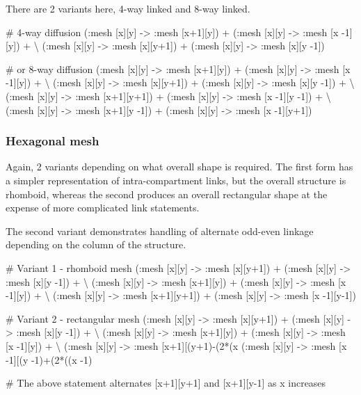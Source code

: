 There are 2 variants here, 4-way linked and 8-way linked.

\begin{kappasource}

# 4-way diffusion
    (:mesh [x][y] -> :mesh [x+1][y]) + (:mesh [x][y] -> :mesh [x -1][y]) + {\textbackslash}
    (:mesh [x][y] -> :mesh [x][y+1]) + (:mesh [x][y] -> :mesh [x][y -1])

# or 8-way diffusion
    (:mesh [x][y] -> :mesh [x+1][y]) + (:mesh [x][y] -> :mesh [x -1][y]) + {\textbackslash}
    (:mesh [x][y] -> :mesh [x][y+1]) + (:mesh [x][y] -> :mesh [x][y -1]) + {\textbackslash}
    (:mesh [x][y] -> :mesh [x+1][y+1]) + (:mesh [x][y] -> :mesh [x -1][y -1]) + {\textbackslash}
    (:mesh [x][y] -> :mesh [x+1][y -1]) + (:mesh [x][y] -> :mesh [x -1][y+1])
\end{kappasource}

\subsubsection{Hexagonal mesh}

Again, 2 variants depending on what overall shape is required. The first form has a simpler representation of intra-compartment links, but the overall structure is rhomboid, whereas the second produces an overall rectangular shape at the expense of more complicated link statements.

The second variant demonstrates handling of alternate odd-even linkage depending on the column of the structure.

\begin{kappasource}

# Variant 1 - rhomboid mesh
    (:mesh [x][y] -> :mesh [x][y+1]) + (:mesh [x][y] -> :mesh [x][y -1]) + {\textbackslash}
    (:mesh [x][y] -> :mesh [x+1][y]) + (:mesh [x][y] -> :mesh [x -1][y]) + {\textbackslash}
    (:mesh [x][y] -> :mesh [x+1][y+1]) + (:mesh [x][y] -> :mesh [x -1][y-1])

# Variant 2 - rectangular mesh
    (:mesh [x][y] -> :mesh [x][y+1]) + (:mesh [x][y] -> :mesh [x][y -1]) + {\textbackslash}
    (:mesh [x][y] -> :mesh [x+1][y]) + (:mesh [x][y] -> :mesh [x -1][y]) + {\textbackslash}
    (:mesh [x][y] -> :mesh [x+1][(y+1)-(2*(x%
    (:mesh [x][y] -> :mesh [x -1][(y -1)+(2*((x -1)%

# The above statement alternates [x+1][y+1] and [x+1][y-1] as x increases
\end{kappasource}


